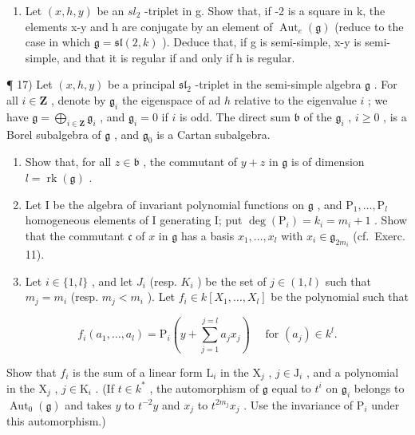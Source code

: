 \begin{enumerate}
\def\labelenumi{\arabic{enumi})}
\setcounter{enumi}{15}
\tightlist
\item
  Let \((x,h,y)\) be an \(sl_{2}\) -triplet in g. Show that, if -2 is a square in k, the elements x-y and h are conjugate by an element of \(\operatorname{Aut}_{e}(\mathfrak{g})\) (reduce to the case in which \(\mathfrak{g}=\mathfrak{sl}(2,k)\) ). Deduce that, if g is semi-simple, x-y is semi-simple, and that it is regular if and only if h is regular.
\end{enumerate}

¶ 17) Let \((x, h, y)\) be a principal \(\mathfrak{sl}_2\) -triplet in the semi-simple algebra \(\mathfrak{g}\) . For all \(i \in \mathbf{Z}\) , denote by \(\mathfrak{g}_i\) the eigenspace of ad \(h\) relative to the eigenvalue \(i\) ; we have \(\mathfrak{g} = \bigoplus_{i \in \mathbf{Z}} \mathfrak{g}_i\) , and \(\mathfrak{g}_i = 0\) if \(i\) is odd. The direct sum \(\mathfrak{b}\) of the \(\mathfrak{g}_i\) , \(i \geq 0\) , is a Borel subalgebra of \(\mathfrak{g}\) , and \(\mathfrak{g}_0\) is a Cartan subalgebra.

\begin{enumerate}
\def\labelenumi{\alph{enumi})}
\item
  Show that, for all \(z \in \mathfrak{b}\) , the commutant of \(y + z\) in \(\mathfrak{g}\) is of dimension \(l = \operatorname{rk}(\mathfrak{g})\) .
\item
  Let I be the algebra of invariant polynomial functions on \(\mathfrak{g}\) , and \(\mathrm{P}_1, \ldots, \mathrm{P}_l\) homogeneous elements of I generating I; put \(\deg(\mathrm{P}_i) = k_i = m_i + 1\) . Show that the commutant \(\mathfrak{c}\) of \(x\) in \(\mathfrak{g}\) has a basis \(x_1, \ldots, x_l\) with \(x_i \in \mathfrak{g}_{2m_i}\) (cf.~Exerc. 11).
\item
  Let \(i \in \{1, l\}\) , and let \(J_i\) (resp. \(K_i\) ) be the set of \(j \in (1, l)\) such that \(m_j = m_i\) (resp. \(m_j < m_i\) ). Let \(f_i \in k[X_1, \ldots, X_l]\) be the polynomial such that
\end{enumerate}

\[
f _ {i} \left(a _ {1}, \dots , a _ {l}\right) = \mathrm{P} _ {i} \left(y + \sum_ {j = 1} ^ {j = l} a _ {j} x _ {j}\right) \quad \text { for } \left(a _ {j}\right) \in k ^ {l}.
\]

Show that \(f_{i}\) is the sum of a linear form \(\mathrm{L}_i\) in the \(\mathrm{X}_j\) , \(j \in \mathrm{J}_i\) , and a polynomial in the \(\mathrm{X}_j\) , \(j \in \mathrm{K}_i\) . (If \(t \in k^*\) , the automorphism of \(\mathfrak{g}\) equal to \(t^i\) on \(\mathfrak{g}_i\) belongs to \(\operatorname{Aut}_0(\mathfrak{g})\) and takes \(y\) to \(t^{-2}y\) and \(x_j\) to \(t^{2m_j}x_j\) . Use the invariance of \(\mathrm{P}_i\) under this automorphism.)

